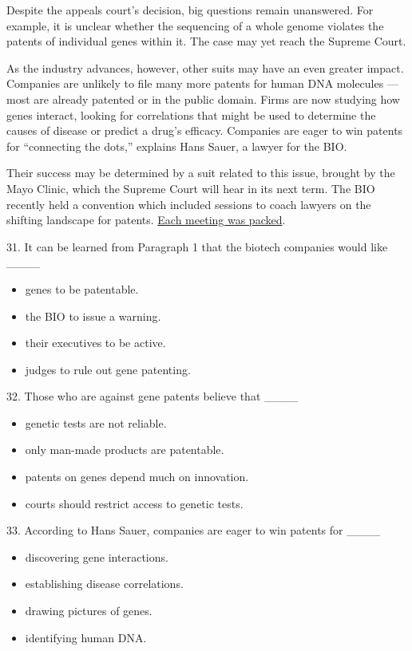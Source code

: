 \documentclass[UTF8,11pt]{ctexart}
\begin{document}
Despite the appeals court’s decision, big questions remain unanswered. For example, it is unclear whether the sequencing of a whole genome violates the patents of individual genes within it. The case may yet reach the Supreme Court.


As the industry advances, however, other suits may have an even greater impact. Companies are unlikely to file many more patents for human DNA molecules — most are already patented or in the public domain. Firms are now studying how genes interact, looking for correlations that might be used to determine the causes of disease or predict a drug’s efficacy. Companies are eager to win patents for “connecting the dots,” explains Hans Sauer, a lawyer for the BIO.


Their success may be determined by a suit related to this issue, brought by the Mayo Clinic, which the Supreme Court will hear in its next term. The BIO recently held a convention which included sessions to coach lawyers on the shifting landscape for patents. \uline{Each meeting was packed}.


31. It can be learned from Paragraph 1 that the biotech companies would like \_\_\_\_


\begin{itemize}[leftmargin=2em,itemsep=.2em,topsep=.4em]\item[A.] genes to be patentable.
\item[B.] the BIO to issue a warning.
\item[C.] their executives to be active.
\item[D.] judges to rule out gene patenting.
\end{itemize}

32. Those who are against gene patents believe that \_\_\_\_


\begin{itemize}[leftmargin=2em,itemsep=.2em,topsep=.4em]\item[A.] genetic tests are not reliable.
\item[B.] only man-made products are patentable.
\item[C.] patents on genes depend much on innovation.
\item[D.] courts should restrict access to genetic tests.
\end{itemize}

33. According to Hans Sauer, companies are eager to win patents for \_\_\_\_


\begin{itemize}[leftmargin=2em,itemsep=.2em,topsep=.4em]\item[A.] discovering gene interactions.
\item[B.] establishing disease correlations.
\item[C.] drawing pictures of genes.
\item[D.] identifying human DNA.
\end{itemize}
\end{document}
